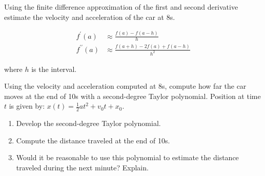 \documentclass[a4paper,12pt]{article}
\begin{document}
\begin{enumerate}
 	Using the finite difference approximation of the first and second derivative estimate the velocity and acceleration of the car at 8s.
 	
 	\begin{align*}
 		f^\prime(a) & \approx \frac{f(a) - f(a - h)}{h} \\
 		f^{\prime\prime}(a) & \approx \frac{f(a + h) - 2 f(a) + f (a - h)}{h^2}
 	\end{align*}
 	
 	where $h$ is the interval. 
 	
 	Using the velocity and acceleration computed at 8s, compute how far the car moves at the end of 10s with a second-degree Taylor polynomial. Position at time $t$ is given by: $x(t) = \frac{1}{2}at^2 + v_0t + x_0$. 
 	
 	\begin{enumerate}
 		\item Develop the second-degree Taylor polynomial. 
 		\item Compute the distance traveled at the end of 10s.
 		\item Would it be reasonable to use this polynomial to estimate the distance traveled during the next minute? Explain.
 	\end{enumerate}
 

\end{enumerate}
\end{document}
